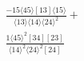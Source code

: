\documentclass[varwidth, border=5pt]{standalone}
\begin{document}
\begin{my}
$\begin{gathered}
\scriptscriptstyle\frac{-15⟨45⟩[13]⟨15⟩}{⟨13⟩⟨14⟩⟨24⟩^2}+\\
\scriptscriptstyle\frac{1⟨45⟩^2[34][23]}{⟨14⟩^2⟨24⟩^2[24]}\phantom{+}
\end{gathered}$
\end{my}
\end{document}
